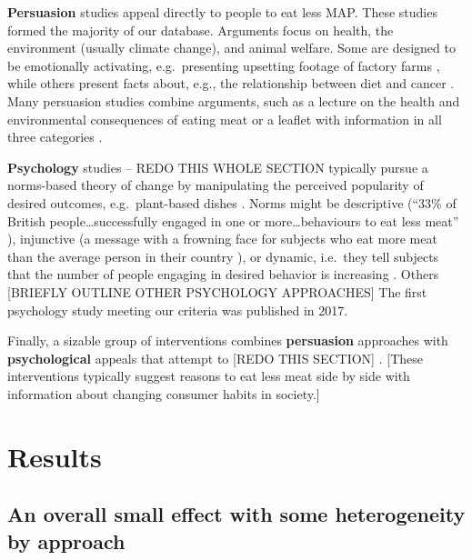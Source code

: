 \documentclass[sn-nature,pdflatex]{sn-jnl}
\begin{document}
\textbf{Persuasion} studies
\citep{kanchanachitra2020, bochmann2017, bschaden2020, cooney2016, feltz2022, haile2021, mathur2021effectiveness, peacock2017, polanco2022, sparkman2021, abrahamse2007, acharya2004, banerjee2019, berndsen2005, bertolaso2015, bianchi2022, fehrenbach2015, hatami2018, jalil2023, merrill2009, norris2014, shreedhar2021, weingarten2022}
appeal directly to people to eat less MAP. These studies formed the
majority of our database. Arguments focus on health, the environment
(usually climate change), and animal welfare. Some are designed to be
emotionally activating, e.g.~presenting upsetting footage of factory
farms \citep{bertolaso2015}, while others present facts about, e.g., the
relationship between diet and cancer \citep{hatami2018}. Many persuasion
studies combine arguments, such as a lecture on the health and
environmental consequences of eating meat \citep{jalil2023} or a leaflet
with information in all three categories \citep{hennessy2016}.

\textbf{Psychology} studies -- REDO THIS WHOLE SECTION
\citep{aldoh2023, allen2002, alblas2023, coker2022, griesoph2021, piester2020, sparkman2017, sparkman2020}
typically pursue a norms-based theory of change by manipulating the
perceived popularity of desired outcomes, e.g.~plant-based dishes
\citep{sparkman2017}. Norms might be descriptive (``33\% of British
people\ldots successfully engaged in one or more\ldots behaviours to eat
less meat'' \citep{aldoh2023}), injunctive (a message with a frowning
face for subjects who eat more meat than the average person in their
country \citep{alblas2023}), or dynamic, i.e.~they tell subjects that
the number of people engaging in desired behavior is increasing
\citep{aldoh2023, coker2022, sparkman2017, sparkman2020}. Others
{[}BRIEFLY OUTLINE OTHER PSYCHOLOGY APPROACHES{]} The first psychology
study meeting our criteria was published in 2017.

Finally, a sizable group of interventions combines \textbf{persuasion}
approaches with \textbf{psychological} appeals that attempt to {[}REDO
THIS SECTION{]}
\citep{hennessy2016, carfora2023, mattson2020, piester2020}. {[}These
interventions typically suggest reasons to eat less meat side by side
with information about changing consumer habits in society.{]}

\section{Results}\label{sec2}

\subsection{An overall small effect with some heterogeneity by
approach}\label{sec2.1}
\end{document}
